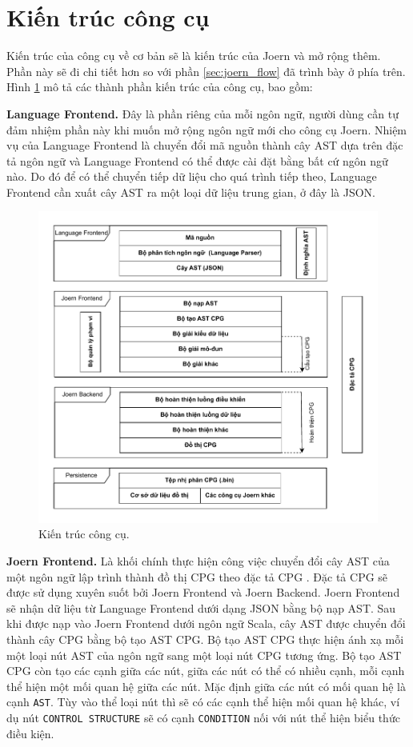 \section{Kiến trúc công cụ}
\label{chapter:arch}

Kiến trúc của công cụ về cơ bản sẽ là kiến trúc của Joern và mở rộng thêm.
Phần này sẽ đi chi tiết hơn so với phần \ref{sec:joern_flow} đã trình bày ở phía trên.
Hình \ref{img:c3_arch} mô tả các thành phần kiến trúc của công cụ, bao gồm:

\textbf{Language Frontend.} Đây là phần riêng của mỗi ngôn ngữ, người dùng cần tự đảm nhiệm phần này khi muốn mở rộng ngôn ngữ mới cho công cụ Joern.
Nhiệm vụ của Language Frontend là chuyển đổi mã nguồn thành cây AST dựa trên đặc tả ngôn ngữ và Language Frontend có thể được cài đặt bằng bất cứ ngôn ngữ nào.
Do đó để có thể chuyển tiếp dữ liệu cho quá trình tiếp theo, Language Frontend cần xuất cây AST ra một loại dữ liệu trung gian, ở đây là JSON.

\begin{figure}[H]
	\includegraphics[width=1\columnwidth]{figures/c3/c3_arch.drawio.pdf}
	\centering
	\caption{Kiến trúc công cụ.}
	\label{img:c3_arch}
\end{figure}

\textbf{Joern Frontend.} Là khối chính thực hiện công việc chuyển đổi cây AST của một ngôn ngữ lập trình thành đồ thị CPG theo đặc tả CPG \cite{joernCodeProperty}.
Đặc tả CPG sẽ được sử dụng xuyên suốt bởi Joern Frontend và Joern Backend.
Joern Frontend sẽ nhận dữ liệu từ Language Frontend dưới dạng JSON bằng bộ nạp AST.
Sau khi được nạp vào Joern Frontend dưới ngôn ngữ Scala, cây AST được chuyển đổi thành cây CPG bằng bộ tạo AST CPG.
Bộ tạo AST CPG thực hiện ánh xạ mỗi một loại nút AST của ngôn ngữ sang một loại nút CPG tương ứng.
Bộ tạo AST CPG còn tạo các cạnh giữa các nút, giữa các nút có thể có nhiều cạnh, mỗi cạnh thể hiện một mối quan hệ giữa các nút.
Mặc định giữa các nút có mối quan hệ là cạnh \texttt{AST}.
Tùy vào thể loại nút thì sẽ có các cạnh thể hiện mối quan hệ khác, ví dụ nút \texttt{CONTROL STRUCTURE} sẽ có cạnh \texttt{CONDITION} nối với nút thể hiện biểu thức điều kiện.

